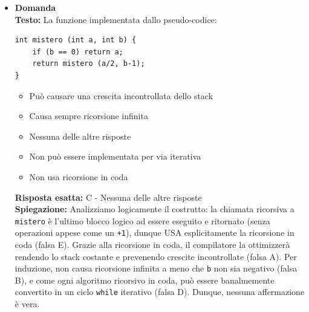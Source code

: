 \documentclass[12pt, a4paper]{article}
\newcounter{domandateoria}
\begin{document}
\begin{itemize}
    \item {}\textbf{Domanda \thedomandateoria} \\
    \textbf{Testo:} La funzione implementata dallo pseudo-codice:
\begin{verbatim}
int mistero (int a, int b) {
    if (b == 0) return a;
    return mistero (a/2, b-1);
}
\end{verbatim}
    \begin{itemize}
        \item[A)] Può causare una crescita incontrollata dello stack
        \item[B)] Causa sempre ricorsione infinita
        \item[C)] Nessuna delle altre risposte
        \item[D)] Non può essere implementata per via iterativa
        \item[E)] Non usa ricorsione in coda
    \end{itemize}
    \textbf{Risposta esatta:} C - Nessuna delle altre risposte \\
    \textbf{Spiegazione:} Analizziamo logicamente il costrutto: la chiamata ricorsiva a \texttt{mistero} è l'ultimo blocco logico ad essere eseguito e ritornato (senza operazioni appese come un \texttt{+1}), dunque USA esplicitamente la ricorsione in coda (falsa E). Grazie alla ricorsione in coda, il compilatore la ottimizzerà rendendo lo stack costante e prevenendo crescite incontrollate (falsa A). Per induzione, non causa ricorsione infinita a meno che \texttt{b} non sia negativo (falsa B), e come ogni algoritmo ricorsivo in coda, può essere banalmemente convertito in un ciclo \texttt{while} iterativo (falsa D). Dunque, nessuna affermazione è vera.
    \vspace{0.3cm}


\end{itemize}
\end{document}
